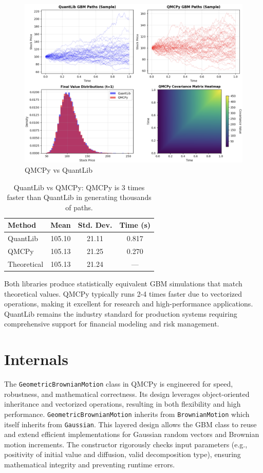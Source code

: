 \documentclass{article}
\begin{document}
\begin{figure}[t!]
\centering
\includegraphics[width=1\textwidth]{images/figure_5.png}
\caption{QMCPy vs QuantLib}
\end{figure}

\begin{table}[t]
\centering
\caption{QuantLib vs QMCPy: QMCPy is 3 times faster than QuantLib in generating thousands of paths.}
\begin{tabular}{lccc}
\toprule
\textbf{Method} & \textbf{Mean} & \textbf{Std. Dev.} & \textbf{Time (s)}   \\
\midrule
QuantLib & 105.10 & 21.11 & 0.817  \\
QMCPy & 105.13 & 21.25 & 0.270  \\
Theoretical & 105.13 & 21.24 & ---  \\
\bottomrule
\end{tabular}
\label{tab2}
\end{table}

Both libraries produce statistically equivalent GBM simulations that match theoretical values. QMCPy typically runs 2-4 times faster due to vectorized operations, making it excellent for research and high-performance applications. QuantLib remains the industry standard for production systems requiring comprehensive  support for financial modeling and risk management.


\section{Internals}

The \texttt{GeometricBrownianMotion} class in QMCPy is engineered for speed, robustness, and mathematical correctness. Its design leverages object-oriented inheritance and vectorized operations, resulting in both flexibility and high performance.
\texttt{GeometricBrownianMotion} inherits from \texttt{BrownianMotion} which itself inherits from \texttt{Gaussian}. This layered design allows the GBM class to reuse and extend efficient implementations for Gaussian random vectors and Brownian motion increments.
The constructor rigorously checks input parameters (e.g., positivity of initial value and diffusion, valid decomposition type), ensuring mathematical integrity and preventing runtime errors.
\end{document}
